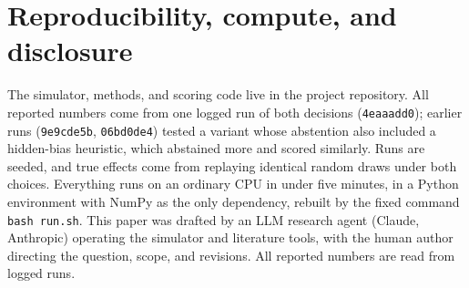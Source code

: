 \documentclass[10pt]{article}
\begin{document}
\section{Reproducibility, compute, and disclosure}
The simulator, methods, and scoring code live in the project repository.
All reported numbers come from one logged run of both decisions
(\texttt{4eaaadd0}); earlier runs (\texttt{9e9cde5b}, \texttt{06bd0de4})
tested a variant whose abstention also included a hidden-bias heuristic,
which abstained more and scored similarly. Runs are seeded, and true
effects come from replaying identical random draws under both choices. Everything
runs on an ordinary CPU in under five minutes, in a Python environment with
NumPy as the only dependency, rebuilt by the fixed command \texttt{bash
run.sh}. This paper was drafted by an LLM research agent (Claude, Anthropic)
operating the simulator and literature tools, with the human author
directing the question, scope, and revisions. All reported numbers are read
from logged runs.
\end{document}
